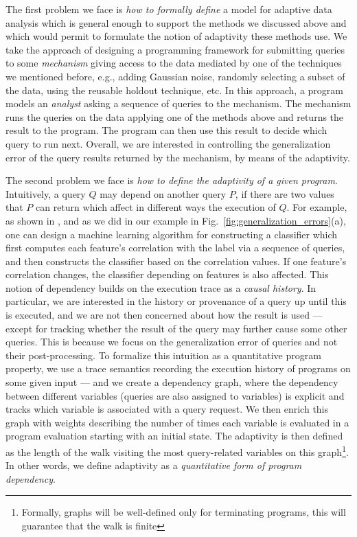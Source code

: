 The first problem we face is \emph{how to formally define} a model for adaptive data analysis which is general enough to support the methods we discussed above and which would permit to formulate the notion of adaptivity these methods use. We take the approach of designing a programming framework for submitting queries to some \emph{mechanism} giving access to the data mediated by one of the techniques we mentioned before, e.g., adding Gaussian noise, randomly selecting a subset of the data, using the reusable holdout technique, etc. In this approach, a program models an \emph{analyst} asking a sequence of queries to the mechanism. The mechanism runs the queries on the data applying one of the methods above and returns the result to the program. The program can then use this result to decide which query to run next. Overall, we are interested in controlling the generalization error of the query results returned by the mechanism, by means of the adaptivity. 

The second problem we face is \emph{how to define the adaptivity of a given program}.
Intuitively, a query $Q$ may depend on another query $P$, if there are two values that $P$ can return which affect in different ways the execution of $Q$. 
For example, as shown in \cite{dwork2015reusable}, and as we did in our example in Fig.~\ref{fig:generalization_errors}(a), one can design a machine learning algorithm for constructing a classifier which first computes each feature's correlation with the label via a sequence of queries, and then constructs the classifier based on the correlation values. If one feature's correlation changes, the classifier depending on features is also affected.  
This notion of dependency builds on the execution trace as a \emph{causal history}. In particular, we are interested in the history or provenance of a query up until this is executed, and we are not then concerned about how the result is used --- except for tracking whether the result of the query may further cause some other queries. This is because we focus on the generalization error of queries and not their post-processing. %
To formalize this intuition as a quantitative program property,
we use a trace semantics recording the execution history of programs on some given input --- and we create a dependency graph, where the dependency between different variables (queries are also assigned to variables) is explicit and tracks which variable is associated with a query request. We then enrich this graph with weights describing the number of times each variable is evaluated in a program evaluation starting with an initial state. The adaptivity is then defined as the length of the walk visiting the most query-related variables on this graph\footnote{Formally, graphs will be well-defined only for terminating programs, this will guarantee that the walk is finite}. In other words, we define adaptivity as a \emph{quantitative form of program dependency}.

